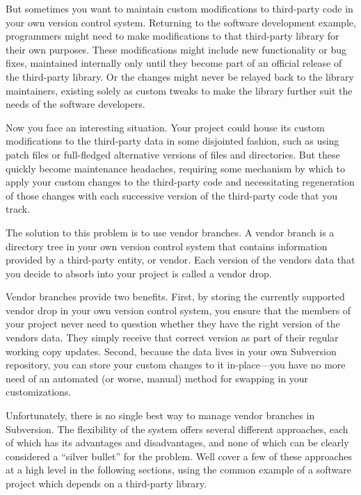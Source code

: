 But sometimes you want to maintain custom modifications to third-party
code in your own version control system. Returning to the software
development example, programmers might need to make modifications to
that third-party library for their own purposes. These modifications
might include new functionality or bug fixes, maintained internally only
until they become part of an official release of the third-party
library. Or the changes might never be relayed back to the library
maintainers, existing solely as custom tweaks to make the library
further suit the needs of the software developers.

Now you face an interesting situation. Your project could house its
custom modifications to the third-party data in some disjointed fashion,
such as using patch files or full-fledged alternative versions of files
and directories. But these quickly become maintenance headaches,
requiring some mechanism by which to apply your custom changes to the
third-party code and necessitating regeneration of those changes with
each successive version of the third-party code that you track.

The solution to this problem is to use vendor branches. A vendor branch
is a directory tree in your own version control system that contains
information provided by a third-party entity, or vendor. Each version of
the vendor\textquotesingle s data that you decide to absorb into your
project is called a vendor drop.

Vendor branches provide two benefits. First, by storing the currently
supported vendor drop in your own version control system, you ensure
that the members of your project never need to question whether they
have the right version of the vendor\textquotesingle s data. They simply
receive that correct version as part of their regular working copy
updates. Second, because the data lives in your own Subversion
repository, you can store your custom changes to it in-place---you have
no more need of an automated (or worse, manual) method for swapping in
your customizations.

Unfortunately, there is no single best way to manage vendor branches in
Subversion. The flexibility of the system offers several different
approaches, each of which has its advantages and disadvantages, and none
of which can be clearly considered a ``silver bullet'' for the problem.
We\textquotesingle ll cover a few of these approaches at a high level in
the following sections, using the common example of a software project
which depends on a third-party library.

